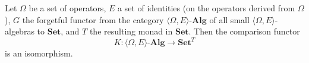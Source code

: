 Let $\Omega$ be a set of operators, $E$ a set of identities (on the operators derived from $\Omega$), $G$ the forgetful functor from the category $\langle \Omega, E \rangle\text{-}\mathbf{Alg}$ of all small $\langle \Omega, E \rangle$-algebras to $\mathbf{Set}$, and $T$ the resulting monad in $\mathbf{Set}$. Then the comparison functor
$$K: \langle \Omega, E \rangle\text{-}\mathbf{Alg} \to \mathbf{Set}^T$$
is an isomorphism.
